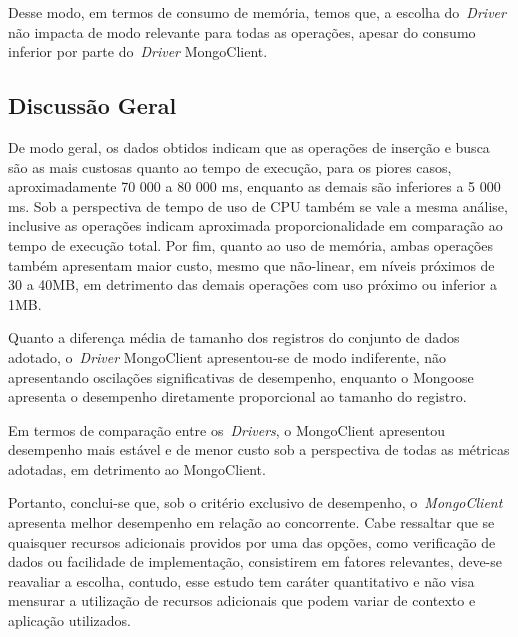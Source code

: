 \documentclass[12pt]{article}
\begin{document}
Desse modo, em termos de consumo de memória, temos que, a escolha do~\emph{Driver} não impacta de modo relevante para todas as operações, apesar do consumo inferior por parte do~\emph{Driver} MongoClient.

\subsection{Discussão Geral}
\label{qgeral}

De modo geral, os dados obtidos indicam que as operações de inserção e busca são as mais custosas quanto ao tempo de execução, para os piores casos, aproximadamente 70 000 a 80 000 ms, enquanto as demais são inferiores a 5 000 ms.
Sob a perspectiva de tempo de uso de CPU também se vale a mesma análise, inclusive as operações indicam aproximada proporcionalidade em comparação ao tempo de execução total.
Por fim, quanto ao uso de memória, ambas operações também apresentam maior custo, mesmo que não-linear, em níveis próximos de 30 a 40MB, em detrimento das demais operações com uso próximo ou inferior a 1MB.

Quanto a diferença média de tamanho dos registros do conjunto de dados adotado, o~\emph{Driver} MongoClient apresentou-se de modo indiferente, não apresentando oscilações significativas de desempenho, enquanto o Mongoose apresenta o desempenho diretamente proporcional ao tamanho do registro.

Em termos de comparação entre os~\emph{Drivers}, o MongoClient apresentou desempenho mais estável e de menor custo sob a perspectiva de todas as métricas adotadas, em detrimento ao MongoClient.

Portanto, conclui-se que, sob o critério exclusivo de desempenho, o~\emph{MongoClient} apresenta melhor desempenho em relação ao concorrente.
Cabe ressaltar que se quaisquer recursos adicionais providos por uma das opções, como verificação de dados ou facilidade de implementação, consistirem em fatores relevantes, deve-se reavaliar a escolha, contudo, esse estudo tem caráter quantitativo e não visa mensurar a utilização de recursos adicionais que podem variar de contexto e aplicação utilizados.


\end{document}
